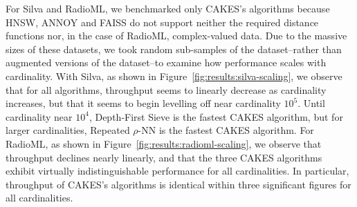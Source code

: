 For Silva and RadioML, we benchmarked only CAKES's algorithms because HNSW, ANNOY and FAISS do not support neither the required distance functions nor, in the case of RadioML, complex-valued data.
Due to the massive sizes of these datasets, we took random sub-samples of the dataset--rather than augmented versions of the dataset--to examine how performance scales with cardinality.
With Silva, as shown in Figure~\ref{fig:results:silva-scaling}, we observe that for all algorithms, throughput seems to linearly decrease as cardinality increases, but that it seems to begin levelling off near cardinality $10^5$.
Until cardinality near $10^4$, Depth-First Sieve is the fastest CAKES algorithm, but for larger cardinalities, Repeated $\rho$-NN is the fastest CAKES algorithm.
For RadioML, as shown in Figure~\ref{fig:results:radioml-scaling}, we observe that throughput declines nearly linearly, and that the three CAKES algorithms exhibit virtually indistinguishable performance for all cardinalities.
In particular, throughput of CAKES's algorithms is identical within three significant figures for all cardinalities.

